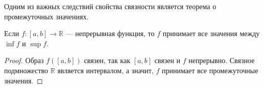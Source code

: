 Одним из важных следствий свойства связности является теорема о промежуточных значениях.

\begin{corollary}
Если $ f : [a, b] \to \mathbb{R} $ — непрерывная функция, то $ f $ принимает все значения между $ \inf f $ и $ \sup f $.
\end{corollary}

\begin{proof}
Образ $ f([a, b]) $ связен, так как $ [a, b] $ связен и $ f $ непрерывно. Связное подмножество $ \mathbb{R} $ является интервалом, а значит, $ f $ принимает все промежуточные значения.
\end{proof}



		
		
		
		
		



